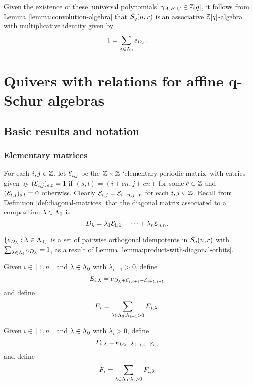 \documentclass[a4paper, 11pt]{report}
\begin{document}
Given the existence of these `universal polynomials' $\gamma_{A,B,C}\in\mathbb{Z}[q]$, it follows from Lemma \ref{lemma:convolution-algebra} that $\hat{S}_q(n,r)$ is an associative $\mathbb{Z}[q]$-algebra with multiplicative identity given by
\begin{equation*}
1 = \sum_{\lambda\in{\Lambda_0}} e_{D_\lambda}.
\end{equation*}

\chapter{Quivers with relations for affine q-Schur algebras}

\section{Basic results and notation}

\subsection{Elementary matrices}

For each $i,j\in\mathbb{Z}$, let $\mathcal{E}_{i,j}$ be the $\mathbb{Z}\times\mathbb{Z}$ `elementary periodic matrix' with entries given by $(\mathcal{E}_{i,j})_{s,t}=1$ if $(s,t) = (i+cn,j+cn)$ for some $c\in\mathbb{Z}$ and $(\mathcal{E}_{i,j})_{s,t}=0$ otherwise. Clearly $\mathcal{E}_{i,j} = \mathcal{E}_{i+n,j+n}$ for each $i,j\in\mathbb{Z}$. Recall from Definition \ref{def:diagonal-matrices} that the diagonal matrix associated to a composition $\lambda\in{\Lambda_0}$ is
\begin{equation*}
D_\lambda = \lambda_1\mathcal{E}_{1,1} +\cdots + \lambda_n\mathcal{E}_{n,n}.
\end{equation*}

$\{e_{D_\lambda}:\lambda\in{\Lambda_0}\}$ is a set of pairwise orthogonal idempotents in $\hat{S}_q(n,r)$ with $\sum_{\lambda\in{\Lambda_0}}e_{D_\lambda} = 1$, as a result of Lemma \ref{lemma:product-with-diagonal-orbits}.

Given $i\in[1,n]$ and $\lambda\in{\Lambda_0}$ with $\lambda_{i+1}>0$, define
\begin{equation*}
E_{i,\lambda} = e_{D_\lambda + \mathcal{E}_{i,i+1} - \mathcal{E}_{i+1,i+1}}
\end{equation*}
and define
\begin{equation*}
E_i = \sum_{\lambda\in{\Lambda_0}:\lambda_{i+1}>0} E_{i,\lambda}.
\end{equation*}

Given $i\in[1,n]$ and $\lambda\in{\Lambda_0}$ with $\lambda_i>0$, define
\begin{equation*}
F_{i,\lambda} = e_{D_\lambda + \mathcal{E}_{i+1,i} - \mathcal{E}_{i,i}}
\end{equation*}
and define
\begin{equation*}
F_i = \sum_{\lambda\in{\Lambda_0}:\lambda_i>0} F_{i,\lambda}
\end{equation*}
\end{document}
